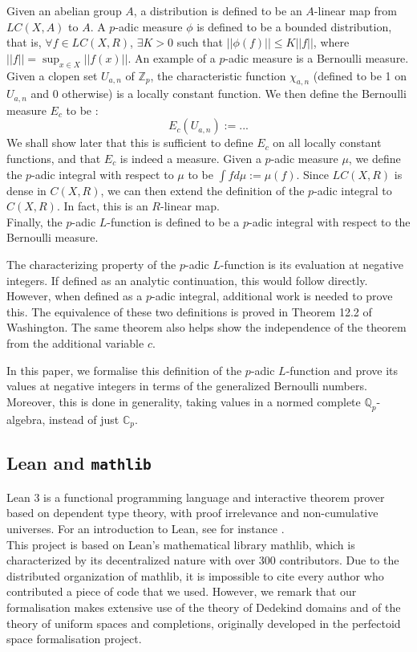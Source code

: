 \documentclass[a4paper,UKenglish,cleveref, autoref, thm-restate]{lipics-v2021}
\newcommand{\lean}[1]{\texttt{#1}\xspace} %
\begin{document}
Given an abelian group $A$, a distribution is defined to be an $A$-linear map from $LC(X, A)$ 
to $A$. A $p$-adic measure $\phi$ is defined to be a bounded distribution, that is, $\forall f \in LC(X, R)$, 
$\exists K > 0$ such that $|| \phi (f) || \le K ||f|| $, where $||f|| = \sup_{x \in X} || f(x)||$. 
An example of a $p$-adic measure is a Bernoulli measure. Given a clopen set $U_{a, n}$ of $\mathbb{Z}_p$, 
the characteristic function $\chi_{a, n}$ (defined to be 1 on $U_{a,n}$ and 0 otherwise) is a locally constant function. 
We then define the Bernoulli measure $E_c$ to be :
$$ E_c(U_{a, n}) := ... $$
We shall show later that this is sufficient to define $E_c$ on all locally constant functions, and that 
$E_c$ is indeed a measure. Given a $p$-adic measure $\mu$, we define the $p$-adic integral with respect 
to $\mu$ to be $\int f d\mu := \mu (f)$. Since $LC(X, R)$ is dense in $C(X, R)$, we can then extend the 
definition of the $p$-adic integral to $C(X, R)$. In fact, this is an $R$-linear map. \\

Finally, the $p$-adic $L$-function is defined to be a $p$-adic integral with respect to the Bernoulli 
measure. 

The characterizing property of the $p$-adic $L$-function is its evaluation at negative integers. If defined as an 
analytic continuation, this would follow directly. However, when defined as a $p$-adic integral, additional work is 
needed to prove this. The equivalence of these two definitions is proved in Theorem 12.2 of Washington. The same theorem 
also helps show the independence of the theorem from the additional variable $c$.

In this paper, we formalise this definition of the $p$-adic $L$-function and prove its values at negative integers in terms of 
the generalized Bernoulli numbers. Moreover, this is done in generality, taking values in a normed complete $\mathbb{Q}_p$-algebra, 
instead of just $\mathbb{C}_p$.
\subsection{Lean and \lean{mathlib}}
Lean 3 is a functional programming language and interactive theorem prover based on
dependent type theory, with proof irrelevance and non-cumulative universes. For an
introduction to Lean, see for instance . \\

This project is based on Lean’s mathematical library mathlib, which is characterized by
its decentralized nature with over 300 contributors. Due to the distributed organization of
mathlib, it is impossible to cite every author who contributed a piece of code that we used.
However, we remark that our formalisation makes extensive use of the theory of Dedekind
domains and of the theory of uniform spaces and completions, originally developed in the
perfectoid space formalisation project. \\
\end{document}
